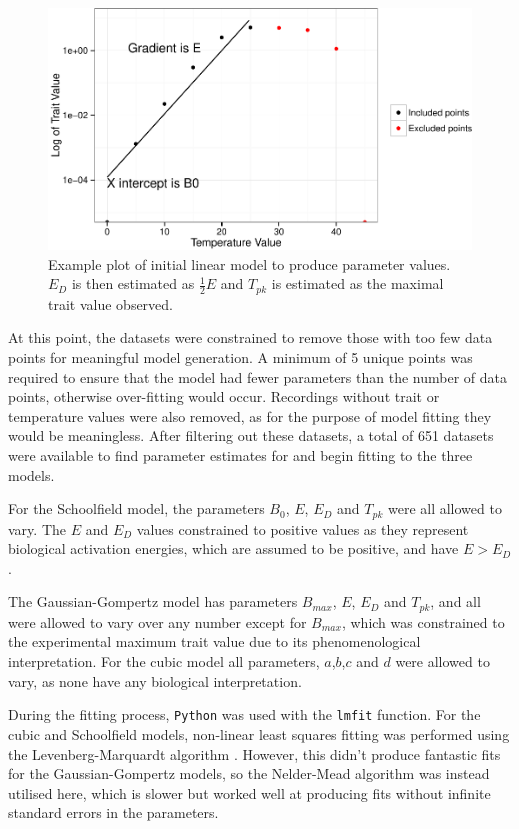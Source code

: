 \documentclass[11pt]{article}
\begin{document}
\begin{figure}[h]
\begin{center}
\includegraphics[scale = 1]{prep_example.pdf}
\caption{Example plot of initial linear model to produce parameter values. \(E_D\) is then estimated as \(\frac{1}{2}E\) and \(T_{pk}\) is estimated as the maximal trait value observed.}
\label{fig:prep}
\end{center}
\end{figure}

At this point, the datasets were constrained to remove those with too few data points for meaningful model generation. A minimum of 5 unique points was required to ensure that the model had fewer parameters than the number of data points, otherwise over-fitting would occur. Recordings without trait or temperature values were also removed, as for the purpose of model fitting they would be meaningless. After filtering out these datasets, a total of 651 datasets were available to find parameter estimates for and begin fitting to the three models.

For the Schoolfield model, the parameters \(B_0\), \(E\), \(E_D\) and \(T_{pk}\) were all allowed to vary. The \(E\) and \(E_D\) values constrained to positive values as they represent biological activation energies, which are assumed to be positive, and have \(E>E_D\).

The Gaussian-Gompertz model has parameters \(B_{max}\), \(E\), \(E_D\) and \(T_{pk}\), and all were allowed to vary over any number except for \(B_{max}\), which was constrained to the experimental maximum trait value due to its phenomenological interpretation. For the cubic model all parameters, \(a\),\(b\),\(c\) and \(d\) were allowed to vary, as none have any biological interpretation.

During the fitting process, \texttt{Python} \citep{python} was used with the \texttt{lmfit} function. For the cubic and Schoolfield models, non-linear least squares fitting was performed using the Levenberg-Marquardt algorithm \citep{Levenberg1944}. However, this didn't produce fantastic fits for the Gaussian-Gompertz models, so the Nelder-Mead algorithm \citep{Nelder1965} was instead utilised here, which is slower but worked well at producing fits without infinite standard errors in the parameters.
\end{document}
